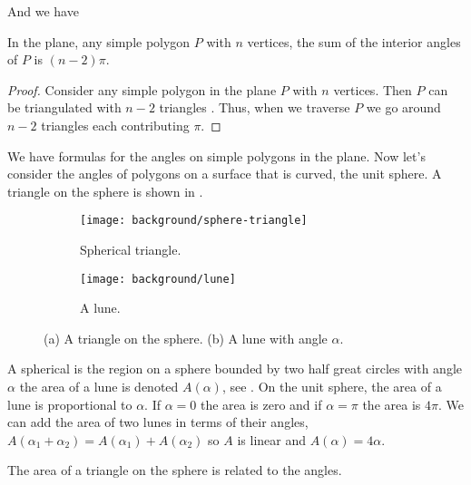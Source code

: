 And we have
\begin{corollary}\label{cor:angles}
In the plane, any simple polygon $P$ with $n$ vertices,
the sum of the interior angles of $P$ is $(n-2)\pi$.
\end{corollary}

\begin{proof}
	Consider any simple polygon in the plane $P$ with $n$ vertices. 
	Then $P$ can be triangulated with $n-2$ triangles \cite{orourke_computational_1994}.
	Thus, when we traverse $P$ we go around $n-2$ triangles each contributing
	$\pi$.
\end{proof}

 






We have formulas for the angles on simple polygons in the plane.
Now let's consider the angles of polygons on a surface that is curved, the unit sphere.
A triangle on the sphere is shown in .



 \begin{figure}[htb]
         \centering
        \begin{subfigure}[b]{0.35\textwidth}
         \texttt{[image: background/sphere-triangle]}
         \caption{Spherical triangle.}
 	 \label{fig:sphere-triangle}
       \end{subfigure}
         \hspace{1cm}
         \begin{subfigure}[b]{0.35\textwidth}
         \texttt{[image: background/lune]}
         \caption{A lune.}
          \label{fig:lune}
         \end{subfigure}
		\caption{(a) A triangle on the sphere.
 		(b) A lune with angle $\alpha$.
 		\label{fig:sphere-lune}}
 \end{figure}
A spherical  is the region on a sphere bounded by two half great circles
with angle $\alpha$ the area of a lune is denoted $A(\alpha)$,
 see .
On the unit sphere, the area of a lune is proportional to $\alpha$. 
If $\alpha=0$ the area is zero and if $\alpha=\pi$ the area is $4\pi$.
We can add the area of two lunes in terms of their angles, 
$A(\alpha_1+\alpha_2)=A(\alpha_1)+A(\alpha_2)$ so $A$ is linear
and  $A(\alpha)=4\alpha.$




The area of a triangle on the sphere is related to the angles.

